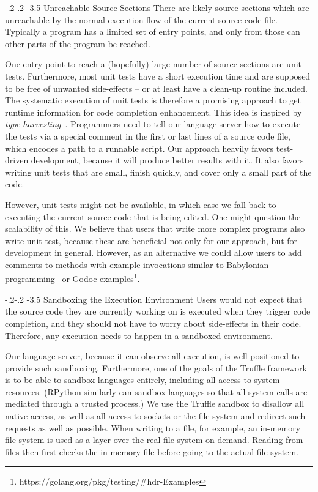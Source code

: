 \documentclass[sigplan,10pt,screen]{acmart}
\makeatletter
\renewcommand\paragraph{\@startsection{paragraph}{4}{\z@}%
   {-.2\baselineskip \@plus -2\p@ \@minus -.2\p@}%
   {-3.5\p@}%
   {\@parfont\@addspaceafter}}
\makeatother
\begin{document}
\paragraph{Unreachable Source Sections}
There are likely source sections which are unreachable by the normal execution
flow of the current source code file. Typically a program has a limited set of
entry points, and only from those can other parts of the program be reached.

One entry point to reach a (hopefully) large number of source sections are unit
tests. Furthermore, most unit tests have a short execution time and are supposed
to be free of unwanted side-effects -- or at least have a clean-up routine
included. The systematic execution of unit tests is therefore a promising
approach to get runtime information for code completion enhancement. This idea
is inspired by \emph{type harvesting}~\cite{haupt2011type}. Programmers need to
tell our language server how to execute the tests via a special comment in the
first or last lines of a source code file, which encodes a path to a runnable
script. Our approach heavily favors test-driven development, because it will
produce better results with it. It also favors writing unit tests that are
small, finish quickly, and cover only a small part of the code.

However, unit tests might not be available, in which case we fall back to
executing the current source code that is being edited. One might question the
scalability of this. We believe that users that write more complex programs also
write unit test, because these are beneficial not only for our approach, but for
development in general. However, as an alternative we could allow users to add
comments to methods with example invocations similar to Babylonian
programming~\cite{DBLP:journals/corr/abs-1902-00549} or Godoc
examples\footnote{https://golang.org/pkg/testing/\#hdr-Examples}.

\paragraph{Sandboxing the Execution Environment}
Users would not expect that the source code they are currently working on is
executed when they trigger code completion, and they should not have to worry
about side-effects in their code. Therefore, any execution needs to happen in a
sandboxed environment.

Our language server, because it can observe all execution, is well positioned to
provide such sandboxing. Furthermore, one of the goals of the Truffle framework
is to be able to sandbox languages entirely, including all access to system
resources. (RPython similarly can sandbox languages so that all system calls are
mediated through a trusted process.) We use the Truffle sandbox to disallow all
native access, as well as all access to sockets or the file system and redirect
such requests as well as possible. When writing to a file, for example, an
in-memory file system is used as a layer over the real file system on demand.
Reading from files then first checks the in-memory file before going to the
actual file system.
\end{document}
